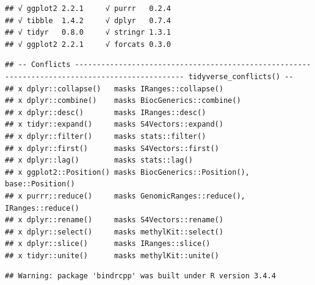 \documentclass[]{article}
\newenvironment{Shaded}{\begin{snugshade}}{\end{snugshade}}
\newcommand{\KeywordTok}[1]{\textcolor[rgb]{0.13,0.29,0.53}{\textbf{#1}}}
\newcommand{\DataTypeTok}[1]{\textcolor[rgb]{0.13,0.29,0.53}{#1}}
\newcommand{\DecValTok}[1]{\textcolor[rgb]{0.00,0.00,0.81}{#1}}
\newcommand{\StringTok}[1]{\textcolor[rgb]{0.31,0.60,0.02}{#1}}
\newcommand{\CommentTok}[1]{\textcolor[rgb]{0.56,0.35,0.01}{\textit{#1}}}
\newcommand{\OperatorTok}[1]{\textcolor[rgb]{0.81,0.36,0.00}{\textbf{#1}}}
\newcommand{\NormalTok}[1]{#1}
\begin{document}
\begin{verbatim}
## √ ggplot2 2.2.1     √ purrr   0.2.4
## √ tibble  1.4.2     √ dplyr   0.7.4
## √ tidyr   0.8.0     √ stringr 1.3.1
## √ ggplot2 2.2.1     √ forcats 0.3.0
\end{verbatim}

\begin{verbatim}
## -- Conflicts ----------------------------------------------------------------------------------------------- tidyverse_conflicts() --
## x dplyr::collapse()   masks IRanges::collapse()
## x dplyr::combine()    masks BiocGenerics::combine()
## x dplyr::desc()       masks IRanges::desc()
## x tidyr::expand()     masks S4Vectors::expand()
## x dplyr::filter()     masks stats::filter()
## x dplyr::first()      masks S4Vectors::first()
## x dplyr::lag()        masks stats::lag()
## x ggplot2::Position() masks BiocGenerics::Position(), base::Position()
## x purrr::reduce()     masks GenomicRanges::reduce(), IRanges::reduce()
## x dplyr::rename()     masks S4Vectors::rename()
## x dplyr::select()     masks methylKit::select()
## x dplyr::slice()      masks IRanges::slice()
## x tidyr::unite()      masks methylKit::unite()
\end{verbatim}

\begin{Shaded}
\end{Shaded}

\begin{verbatim}
## Warning: package 'bindrcpp' was built under R version 3.4.4
\end{verbatim}

\begin{Shaded}
\end{Shaded}
\end{document}

